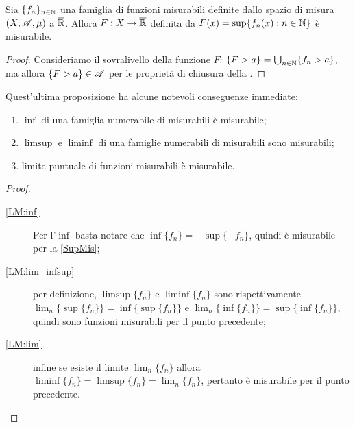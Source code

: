 \begin{proposition}
	\label{SupMis}
	Sia $\{f_n\}_{n\in \mathbb N}$ una famiglia di funzioni misurabili definite dallo spazio di misura $(X,\mathscr A,\mu)$ a $\overline{\mathbb R}$.
	Allora $F:X\rightarrow \overline{\mathbb R}$ definita da $F(x)=\sup\{f_n(x):n\in \mathbb N\}$ è misurabile.
\end{proposition}
\begin{proof}
	Consideriamo il sovralivello della funzione $F$: $\{F>a\}=\bigcup_{n\in \mathbb N}\{f_n>a\}$, ma allora $\{F>a\}\in \mathscr A$ per le proprietà 
	di chiusura della \sigalg.
\end{proof}

\begin{remark}
	\label{LimMis}
	Quest'ultima proposizione ha alcune notevoli conseguenze immediate:
	\begin{enumerate}
		\item $\inf$ di una famiglia numerabile di misurabili è misurabile;\label{LM:inf}
		\item $\limsup$ e $\liminf$ di una famiglie numerabili di misurabili sono misurabili;\label{LM:lim_infsup}
		\item limite puntuale di funzioni misurabili è misurabile.\label{LM:lim}
	\end{enumerate}
\end{remark}
\begin{proof}
	\begin{description}
		\item[\ref{LM:inf}] Per l'$\inf$ basta notare che $\inf\{f_n\}=-\sup\{-f_n\}$, quindi è misurabile per la \cref{SupMis};
		\item[\ref{LM:lim_infsup}] per definizione, $\limsup\{f_n\}$ e $\liminf\{f_n\}$ sono rispettivamente
			$\lim_n\{\sup\{f_n\}\}=\inf\{\sup\{f_n\}\}$ e
			$\lim_n\{\inf\{f_n\}\}=\sup\{\inf\{f_n\}\}$, quindi sono funzioni misurabili per il punto precedente;
		\item[\ref{LM:lim}] infine se esiste il limite $\lim_n\{f_n\}$ allora
			$\liminf\{f_n\}=\limsup\{f_n\}=\lim_n\{f_n\}$, pertanto è misurabile per il punto precedente.
	\end{description}
\end{proof}

